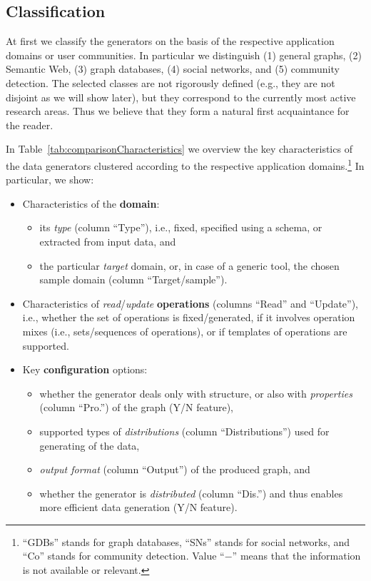 %

\subsection{Classification}

At first we classify the generators on the basis of the respective application domains or user communities. In particular we distinguish (1) general graphs, (2) Semantic Web, (3) graph databases, (4) social networks, and (5) community detection. The selected classes are not rigorously defined (e.g., they are not disjoint as we will show later), but they correspond to the currently most active research areas. Thus we believe that they form a natural first acquaintance for the reader.

In Table~\ref{tab:comparisonCharacteristics}   we overview the key characteristics of the data generators clustered according to the respective application domains.\footnote{``GDBs'' stands for graph databases, ``SNs'' stands for social networks, and ``Co'' stands for community detection. Value ``$-$'' means that the information is not available or relevant.} In particular, we show:

\begin{itemize}
\item Characteristics of the \textbf{domain}:
    \begin{itemize}
      \item its \textit{type} (column ``Type''), i.e.,  fixed, specified using a schema, or extracted from input data, and
      \item the particular \textit{target} domain, or, in case of a generic tool, the chosen sample domain (column ``Target/sample'').
\end{itemize}
\item Characteristics of \textit{read}/\textit{update} \textbf{operations} (columns ``Read'' and ``Update''), i.e., whether the set of operations is fixed/generated, if it involves operation mixes (i.e., sets/sequences of operations), or if templates of operations are supported.
\item Key \textbf{configuration} options:
  \begin{itemize}
    \item whether the generator deals only with structure, or also with \emph{properties} (column ``Pro.'') of the graph (Y/N feature),
    \item supported types of \emph{distributions} (column ``Distributions'') used for generating of the data,
    \item \textit{output format} (column ``Output'') of the produced graph, and
    \item  whether the generator is \textit{distributed} (column ``Dis.'') and thus enables more efficient data generation (Y/N feature).
  \end{itemize}
\end{itemize}


